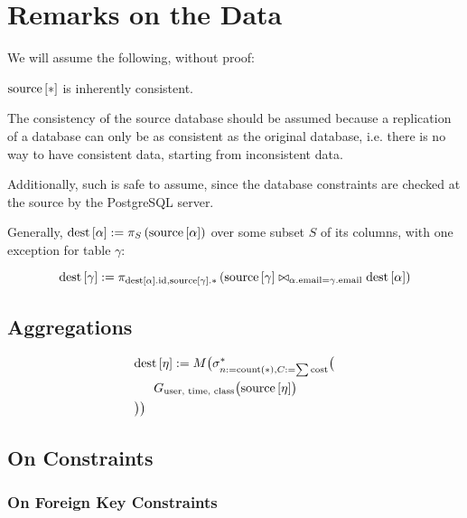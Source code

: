 \chapter{Remarks on the Data}
\label{ch:data}


We will assume the following, without proof:

\begin{axiom}
	$\text{source}\left[{*}\right]$ is inherently consistent.
\end{axiom}

The consistency of the source database should be assumed because a replication of a database can only be as consistent as the original database, i.e. there is no way to have consistent data, starting from inconsistent data.

Additionally, such is safe to assume, since the database constraints are checked at the source by the PostgreSQL server.

Generally, 
$\text{dest}\left[{\alpha}\right] := \pi_{S}\left(\text{source}\left[{\alpha}\right]\right)$
over some subset $S$ of its columns,
with one exception for table $\gamma$:

$$
\text{dest}\left[{\gamma}\right] := \pi_{\text{dest}\left[{\alpha}\right].\text{id}, \text{source}\left[{\gamma}\right].*}
\left(
\text{source}\left[{\gamma}\right] \bowtie_{\alpha.\text{email} = \gamma.\text{email}} \text{dest}\left[{\alpha}\right]
\right)
$$


\section{Aggregations}
\label{sec:aggregations}

\begin{align}
&\dest{\eta} := M\bigl(\sigma^*_{n := \text{count}(*), C := \sum\text{cost}} \bigl( \\
&\ind G_{\text{user, time, class}} \bigl(\source{\eta}\bigr) \nonumber \\
&\bigr)\bigr) \nonumber
\end{align}
\label{agg:eta}


\section{On Constraints}
\subsection{On Foreign Key Constraints}
\label{sec:foreign-key}
